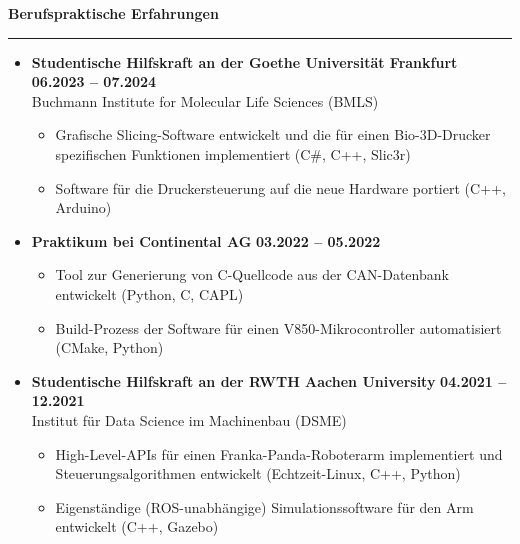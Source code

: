 \documentclass[12pt]{article} %
\newcommand{\HighlightedText}[1] {{\textbf{#1}}}
\newcommand{\PlaceAndTime}[2] {\HighlightedText{#1} \hfill \HighlightedText{#2}}
\newenvironment{ItemizeSection}[1]{
    \vspace{1mm}
    \HighlightedText{#1}
    \vspace{0.5mm}
    {\color{custom_blue} \hrule}
    \begin{itemize}[left=0.5em, topsep=0pt, itemsep=0pt, label={$\bullet$}]
}{
    \end{itemize}
}
\newenvironment{ItemizeSubsection}{
    \begin{itemize}[left=0.5em, topsep=-999pt, itemsep=0pt, label={$\circ$}]
}{
    \end{itemize}
}
\begin{document}
\begin{ItemizeSection}{Berufspraktische Erfahrungen}
    \item \PlaceAndTime{Studentische Hilfskraft an der Goethe Universität Frankfurt}{06.2023 -- 07.2024} \\
    Buchmann Institute for Molecular Life Sciences (BMLS)
    \begin{ItemizeSubsection}
        \item Grafische Slicing-Software entwickelt und die für einen Bio-3D-Drucker spezifischen Funktionen implementiert (C\#, C++, Slic3r)
        \item Software für die Druckersteuerung auf die neue Hardware portiert (C++, Arduino)
    \end{ItemizeSubsection}

    \item \PlaceAndTime{Praktikum bei Continental AG}{03.2022 -- 05.2022}
    \begin{ItemizeSubsection}
        \item Tool zur Generierung von C-Quellcode aus der CAN-Datenbank entwickelt (Python, C, CAPL)
        \item Build-Prozess der Software für einen V850-Mikrocontroller automatisiert (CMake, Python)
    \end{ItemizeSubsection}

    \item \PlaceAndTime{Studentische Hilfskraft an der RWTH Aachen University}{04.2021 -- 12.2021} \\
    Institut für Data Science im Machinenbau (DSME)
    \begin{ItemizeSubsection}
        \item High-Level-APIs für einen Franka-Panda-Roboterarm implementiert und Steuerungsalgorithmen entwickelt (Echtzeit-Linux, C++, Python)
        \item Eigenständige (ROS-unabhängige) Simulationssoftware für den Arm entwickelt (C++, Gazebo)
    \end{ItemizeSubsection}
\end{ItemizeSection}
\end{document}
